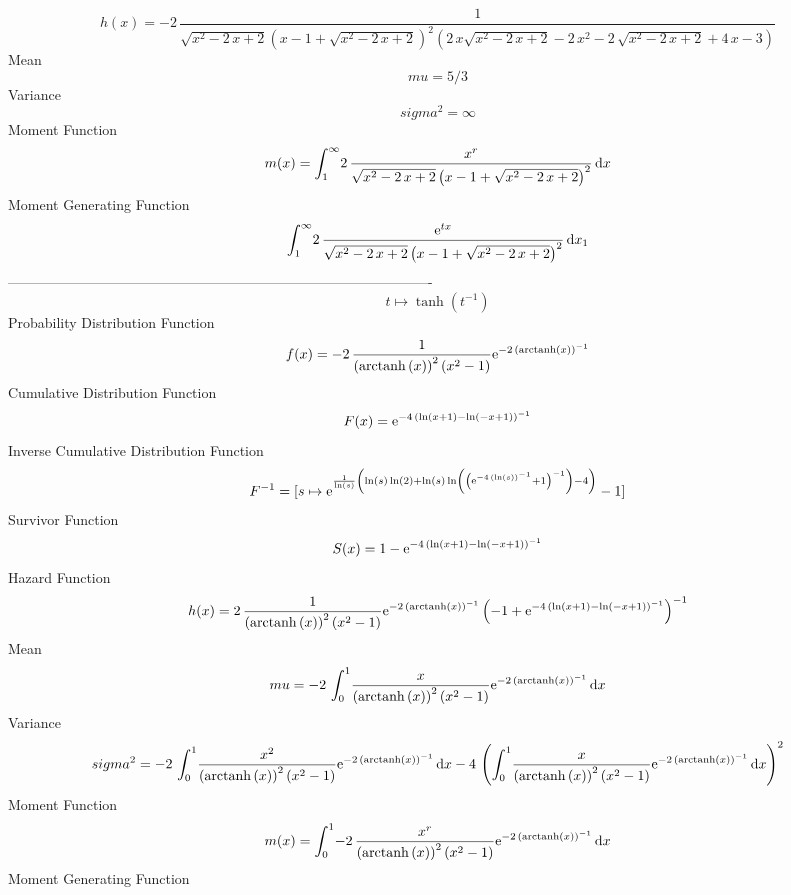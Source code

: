 \documentclass[12pt]{article}
\begin{document}
 $$ h(x)=-2\,{\frac {1}{\sqrt {{x}^{2}-2\,x+2} \left( x-1+\sqrt {{x}^{2}-2\,x+2
} \right) ^{2} \left( 2\,x\sqrt {{x}^{2}-2\,x+2}-2\,{x}^{2}-2\,\sqrt {
{x}^{2}-2\,x+2}+4\,x-3 \right) }}
$$Mean 
 $$ mu=5/3
$$ Variance 
 $$ sigma^2 = \infty 
$$Moment Function 
 $$ m(x) = \int_{1}^{\infty }\!2\,{\frac {{x}^{r}}{\sqrt {{x}^{2}-2\,x+2} \left( 
x-1+\sqrt {{x}^{2}-2\,x+2} \right) ^{2}}}\,{\rm d}x
$$ Moment Generating Function 
 $$\int_{1}^{\infty }\!2\,{\frac {{{\rm e}^{tx}}}{\sqrt {{x}^{2}-2\,x+2}
 \left( x-1+\sqrt {{x}^{2}-2\,x+2} \right) ^{2}}}\,{\rm d}x_{{1}}
$$-------------------------------------------------------------------------------------------  \\$$t\mapsto \tanh \left( {t}^{-1} \right) 
$$Probability Distribution Function 
$$  f(x)=-2\,{\frac {1}{ \left( {\rm arctanh} \left(x\right) \right) ^{2}
 \left( {x}^{2}-1 \right) }{{\rm e}^{-2\, \left( {\rm arctanh} \left(x
\right) \right) ^{-1}}}}
$$Cumulative Distribution Function  
 $$F(x)={{\rm e}^{-4\, \left( \ln  \left( x+1 \right) -\ln  \left( -x+1
 \right)  \right) ^{-1}}}
$$ Inverse Cumulative Distribution Function 
  $$F^{-1} = [s\mapsto {{\rm e}^{{\frac {1}{\ln  \left( s \right) } \left( \ln 
 \left( s \right) \ln  \left( 2 \right) +\ln  \left( s \right) \ln 
 \left(  \left( {{\rm e}^{-4\, \left( \ln  \left( s \right)  \right) ^
{-1}}}+1 \right) ^{-1} \right) -4 \right) }}}-1]
$$Survivor Function 
 $$ S(x)=1-{{\rm e}^{-4\, \left( \ln  \left( x+1 \right) -\ln  \left( -x+1
 \right)  \right) ^{-1}}}
$$ Hazard Function 
 $$ h(x)=2\,{\frac {1}{ \left( {\rm arctanh} \left(x\right) \right) ^{2}
 \left( {x}^{2}-1 \right) }{{\rm e}^{-2\, \left( {\rm arctanh} \left(x
\right) \right) ^{-1}}} \left( -1+{{\rm e}^{-4\, \left( \ln  \left( x+
1 \right) -\ln  \left( -x+1 \right)  \right) ^{-1}}} \right) ^{-1}}
$$Mean 
 $$ mu=-2\,\int_{0}^{1}\!{\frac {x}{ \left( {\rm arctanh} \left(x\right)
 \right) ^{2} \left( {x}^{2}-1 \right) }{{\rm e}^{-2\, \left( 
{\rm arctanh} \left(x\right) \right) ^{-1}}}}\,{\rm d}x
$$ Variance 
 $$ sigma^2 = -2\,\int_{0}^{1}\!{\frac {{x}^{2}}{ \left( {\rm arctanh} \left(x
\right) \right) ^{2} \left( {x}^{2}-1 \right) }{{\rm e}^{-2\, \left( 
{\rm arctanh} \left(x\right) \right) ^{-1}}}}\,{\rm d}x-4\, \left( 
\int_{0}^{1}\!{\frac {x}{ \left( {\rm arctanh} \left(x\right) \right) 
^{2} \left( {x}^{2}-1 \right) }{{\rm e}^{-2\, \left( {\rm arctanh} 
\left(x\right) \right) ^{-1}}}}\,{\rm d}x \right) ^{2}
$$Moment Function 
 $$ m(x) = \int_{0}^{1}\!-2\,{\frac {{x}^{r}}{ \left( {\rm arctanh} \left(x
\right) \right) ^{2} \left( {x}^{2}-1 \right) }{{\rm e}^{-2\, \left( 
{\rm arctanh} \left(x\right) \right) ^{-1}}}}\,{\rm d}x
$$ Moment Generating Function 
\end{document}

